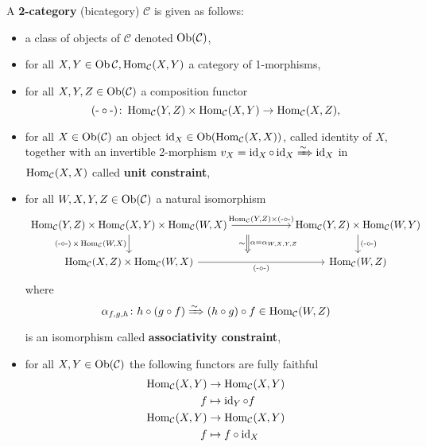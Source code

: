 \begin{defi}
\label{twocat_defi}
	A \textbf{2-category} (bicategory) $ \mathcal{ C }$ is given as follows:
	\begin{itemize}
		\item 
		a class of objects of $ \mathcal{ C } $ denoted $ \operatorname{Ob} ( \mathcal{ C } ) $,
		
		\item 
		for all $ X , Y \in \operatorname{Ob} \mathcal{ C }, \operatorname{Hom}_{ \mathcal{ C} } ( X, Y ) $ a category of 1-morphisms,
		
		\item 
		for all $ X , Y , Z \in \operatorname{Ob} ( \mathcal{C} )$ a composition functor
		\[
			\operatorname{(-\circ-)} \colon \operatorname{Hom}_{\mathcal{C}} ( Y , Z ) \times \operatorname{Hom}_{ \mathcal{ C } } ( X , Y ) \to \operatorname{Hom}_{ \mathcal{ C } } ( X , Z ),
		\]
		
		\item 
		for all $ X \in \operatorname{Ob} ( \mathcal{C} ) $ an object $ \operatorname{id}_X \in \operatorname{Ob}( \operatorname{Hom}_{ \mathcal{ C } }(  X , X ))$, called identity of $ X $, together with an invertible 2-morphism $v_X = \operatorname{id}_X \circ \operatorname{id}_X \xRightarrow{\sim} \operatorname{id}_X$ in $ \operatorname{Hom}_{ \mathcal{ C } } ( X , X )$ called \textbf{unit constraint},
		
		\item 
		for all $ W , X , Y , Z \in \operatorname{Ob} ( \mathcal{ C } ) $ a natural isomorphism 
		\[
		\begin{tikzcd}[column sep = 2cm]
			\Hom_{ \mathcal{ C } } ( Y , Z ) \times 			\Hom_{ \mathcal{ C } } ( X , Y ) \times 			\Hom_{ \mathcal{ C } } ( W , X ) 
			\ar[r, " {\Hom_{ \mathcal{ C } } ( Y , Z ) \times \comp }"]
			\ar[d, "{ \comp \times \Hom_{ \mathcal{ C } } ( W, X ) }"']
			\ar[d, shift left=4cm, Rightarrow, " \alpha= \alpha_{W , X ,Y , Z} " , "\sim"']
			&
			\Hom_{\mathcal{ C } } ( Y, Z ) \times \Hom_{ \mathcal{ C } } ( W , Y ) 
			\ar[d, " \comp "]
			\\
			\Hom_{\mathcal{ C } } ( X , Z ) \times 
			\Hom_{\mathcal{ C } } ( W , X )
			\ar[r, " \comp "' ]
			&
			\Hom_{\mathcal{ C } } ( W , Z )
		\end{tikzcd}
		\]
		where 
		\[
			\alpha_{ f , g , h } \colon h \circ ( g \circ f )
			\xRightarrow{ \sim }
			( h \circ g ) \circ f \in \operatorname{Hom}_{ \mathcal{ C } } ( W , Z )
		\]
		is an isomorphism called \textbf{associativity constraint},
		
		\item 
		for all $ X , Y \in \operatorname{Ob} ( \mathcal{ C } )$ the following functors are fully faithful
		\begin{align*}
			\operatorname{Hom}_{\mathcal{ C } } ( X , Y )
			&\to 
			\operatorname{Hom}_{\mathcal{ C } } ( X , Y )
			\\
			f
			&\mapsto
			\operatorname{id}_Y \circ f 
			\\
			\operatorname{Hom}_{\mathcal{ C } } ( X , Y ) 
			&\to
			\operatorname{Hom}_{\mathcal{ C } } ( X , Y )
			\\
			f
			&\mapsto 
			f \circ \operatorname{id}_X			
		\end{align*}
	

\end{itemize}
\end{defi}
